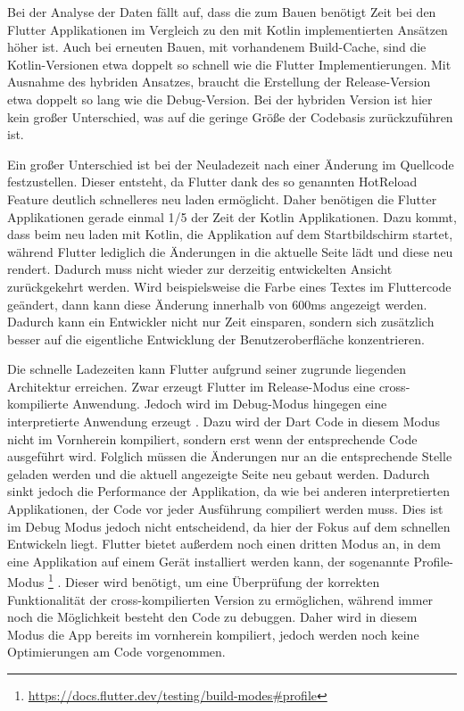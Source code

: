 Bei der Analyse der Daten fällt auf, dass die zum Bauen benötigt Zeit bei den Flutter Applikationen im Vergleich zu den mit Kotlin implementierten Ansätzen höher ist. 
Auch bei erneuten Bauen, mit vorhandenem Build-Cache, sind die Kotlin-Versionen etwa doppelt so schnell wie die Flutter Implementierungen.
Mit Ausnahme des hybriden Ansatzes, braucht die Erstellung der Release-Version etwa doppelt so lang wie die Debug-Version. 
Bei der hybriden Version ist hier kein großer Unterschied, was auf die geringe Größe der Codebasis zurückzuführen ist.

Ein großer Unterschied ist bei der Neuladezeit nach einer Änderung im Quellcode festzustellen. Dieser entsteht, da Flutter dank des so genannten HotReload Feature deutlich schnelleres neu laden ermöglicht. Daher benötigen die Flutter Applikationen gerade einmal 1/5 der Zeit der Kotlin Applikationen. Dazu kommt, dass beim neu laden mit Kotlin, die Applikation auf dem Startbildschirm startet, während Flutter lediglich die Änderungen in die aktuelle Seite lädt und diese neu rendert. Dadurch muss nicht wieder zur derzeitig entwickelten Ansicht zurückgekehrt werden. Wird beispielsweise die Farbe eines Textes im Fluttercode geändert, dann kann diese Änderung innerhalb von 600ms angezeigt werden. Dadurch kann ein Entwickler nicht nur Zeit einsparen, sondern sich zusätzlich besser auf die eigentliche Entwicklung der Benutzeroberfläche konzentrieren.

Die schnelle Ladezeiten kann Flutter aufgrund seiner zugrunde liegenden Architektur erreichen. Zwar erzeugt Flutter im Release-Modus eine cross-kompilierte Anwendung. Jedoch wird im Debug-Modus hingegen eine interpretierte Anwendung erzeugt \cite{flutter_debug_dart}. Dazu wird der Dart Code in diesem Modus nicht im Vornherein kompiliert, sondern erst wenn der entsprechende Code ausgeführt wird. Folglich müssen die Änderungen nur an die entsprechende Stelle geladen werden und die aktuell angezeigte Seite neu gebaut werden. Dadurch sinkt jedoch die Performance der Applikation, da wie bei anderen interpretierten Applikationen, der Code vor jeder Ausführung compiliert werden muss. Dies ist im Debug Modus jedoch nicht entscheidend, da hier der Fokus auf dem schnellen Entwickeln liegt. Flutter bietet außerdem noch einen dritten Modus an, in dem eine Applikation auf einem Gerät installiert werden kann, der sogenannte Profile-Modus \footnote{\url{https://docs.flutter.dev/testing/build-modes\#profile}} \cite{flutter_debug_dart}. 
Dieser wird benötigt, um eine Überprüfung der korrekten Funktionalität der cross-kompilierten Version zu ermöglichen, während immer noch die Möglichkeit besteht den Code zu debuggen. Daher wird in diesem Modus die App bereits im vornherein kompiliert, jedoch werden noch keine Optimierungen am Code vorgenommen.

